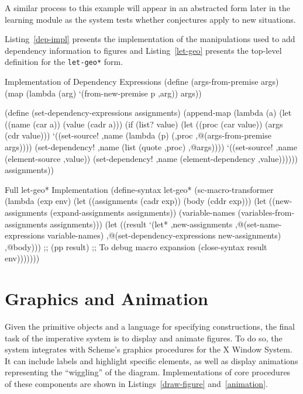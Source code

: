 A similar process to this example will appear in an abstracted form
later in the learning module as the system tests whether conjectures
apply to new situations.

\newpage
Listing~\ref{dep-impl} presents the implementation of the
manipulations used to add dependency information to figures and
Listing~\ref{let-geo} presents the top-level definition for the
\texttt{let-geo*} form.

\begin{code-listing}
[label=dep-impl]
{Implementation of Dependency Expressions}
(define (args-from-premise args)
  (map (lambda (arg)
         `(from-new-premise p ,arg))
       args))

(define (set-dependency-expressions assignments)
  (append-map
   (lambda (a)
     (let ((name (car a))
           (value (cadr a)))
       (if (list? value)
           (let ((proc (car value))
                 (args (cdr value)))
             `((set-source!
                ,name (lambda (p) (,proc ,@(args-from-premise args))))
               (set-dependency!
                ,name (list (quote ,proc) ,@args))))
           `((set-source! ,name (element-source ,value))
             (set-dependency! ,name (element-dependency ,value))))))
   assignments))
\end{code-listing}

\begin{code-listing}
[label=let-geo]
{Full let-geo* Implementation}
(define-syntax let-geo*
  (sc-macro-transformer
   (lambda (exp env)
     (let ((assignments (cadr exp))
           (body (cddr exp)))
       (let ((new-assignments (expand-assignments assignments))
             (variable-names (variables-from-assignments assignments)))
         (let ((result `(let*
                            ,new-assignments
                          ,@(set-name-expressions variable-names)
                          ,@(set-dependency-expressions new-assignments)
                          ,@body)))
           ;; (pp result) ;; To debug macro expansion
           (close-syntax result env)))))))
\end{code-listing}

\newpage
\section{Graphics and Animation}

Given the primitive objects and a language for specifying
constructions, the final task of the imperative system is to display
and animate figures. To do so, the system integrates with Scheme's
graphics procedures for the X Window System. It can include labels and
highlight specific elements, as well as display animations
representing the ``wiggling'' of the diagram. Implementations of core
procedures of these components are shown in Listings~\ref{draw-figure}
and~\ref{animation}.

